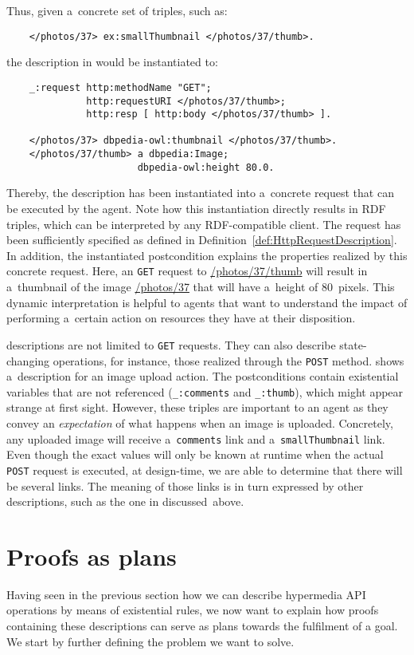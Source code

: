 Thus, given a~concrete set of triples, such as:
\begin{Verbatim}
    </photos/37> ex:smallThumbnail </photos/37/thumb>.
\end{Verbatim}
the description in  would be instantiated to: 
\begin{Verbatim}
    _:request http:methodName "GET";
              http:requestURI </photos/37/thumb>;
              http:resp [ http:body </photos/37/thumb> ].

    </photos/37> dbpedia-owl:thumbnail </photos/37/thumb>.
    </photos/37/thumb> a dbpedia:Image;
                       dbpedia-owl:height 80.0.
\end{Verbatim}
Thereby, the description has been instantiated into a~concrete \http request
that can be executed by the agent.
Note how this instantiation directly results in RDF triples,
which can be interpreted by any RDF-compatible client.
The request has been sufficiently specified
as defined in Definition~\ref{def:HttpRequestDescription}.
In addition, the instantiated postcondition
explains the properties realized by this concrete request.
Here, an \http \verb!GET! request to \url{/photos/37/thumb}
will result in a~thumbnail of the image \url{/photos/37}
that will have a~height of 80~pixels.
This dynamic interpretation is helpful to agents
that want to understand the impact
of performing a~certain action on resources they have at their disposition.

\restdesc descriptions are not limited to \verb!GET! requests.
They can also describe state-changing operations,
for instance, those realized through the \verb!POST! method.
 shows a~description for an image upload action.
The postconditions contain existential variables that are not referenced
(\verb!_:comments! and \verb!_:thumb!),
which might appear strange at first sight.
However, these triples are important to an agent
as they convey an \emph{expectation} of what happens when an image is uploaded.
Concretely, any uploaded image will receive a~\verb!comments! link
and a~\verb!smallThumbnail! link.
Even though the exact values will only be known at runtime
when the actual \verb!POST! request is executed,
at design-time, we are able to determine that there will be several links.
The meaning of those links is in turn expressed by other descriptions,
such as the one in  discussed~above.

 \section{Proofs as plans}
 \label{sec:Proof}
 Having seen in the previous section how we can describe hypermedia API operations by means of existential rules, we now want 
 to explain how proofs containing these \restdesc descriptions can serve as plans towards the fulfilment of a goal. We start by further defining the problem we want to solve.

